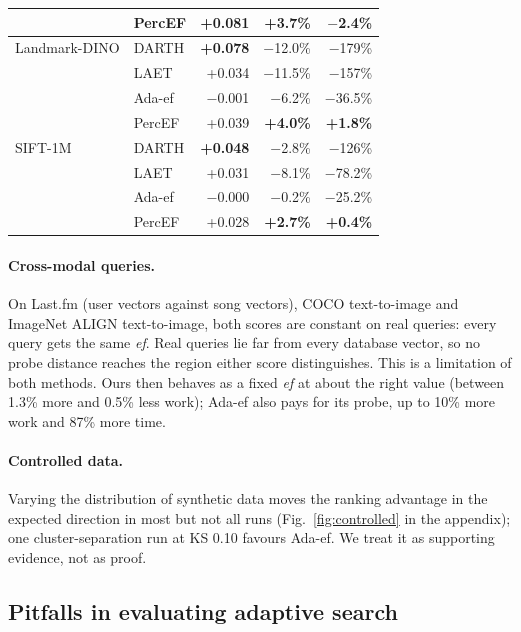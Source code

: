 \documentclass[sigconf,review=false,screen]{acmart}
\newcommand{\ef}{\textit{ef}}
\begin{document}
\begin{table}[t]
\begin{tabular}{llrrr}
                  & PercEF & +0.081 & \textbf{+3.7\%} & \textbf{$-$2.4\%} \\
    \midrule
    Landmark-DINO & DARTH  & \textbf{+0.078} & $-$12.0\% & $-$179\% \\
                  & LAET   & +0.034 & $-$11.5\% & $-$157\% \\
                  & Ada-ef & $-$0.001 & $-$6.2\% & $-$36.5\% \\
                  & PercEF & +0.039 & \textbf{+4.0\%} & \textbf{+1.8\%} \\
    \midrule
    SIFT-1M       & DARTH  & \textbf{+0.048} & $-$2.8\% & $-$126\% \\
                  & LAET   & +0.031 & $-$8.1\% & $-$78.2\% \\
                  & Ada-ef & $-$0.000 & $-$0.2\% & $-$25.2\% \\
                  & PercEF & +0.028 & \textbf{+2.7\%} & \textbf{+0.4\%} \\
    \bottomrule
  \end{tabular}
\end{table}

\paragraph{Cross-modal queries.}
On Last.fm (user vectors against song vectors), COCO text-to-image and ImageNet ALIGN text-to-image,
both scores are constant on real queries: every query gets the same \ef{}. Real queries lie far
from every database vector, so no probe distance reaches the region either score distinguishes.
This is a limitation of both methods. Ours then behaves as a fixed \ef{} at about the right value
(between 1.3\% more and 0.5\% less work); Ada-ef also pays for its probe, up to 10\% more work and
87\% more time.

\paragraph{Controlled data.}
Varying the distribution of synthetic data moves the ranking advantage in the expected direction
in most but not all runs (Fig.~\ref{fig:controlled} in the appendix); one cluster-separation run at
KS 0.10 favours Ada-ef. We treat it as supporting evidence, not as proof.

\subsection{Pitfalls in evaluating adaptive search}\label{sec:pitfalls}
\end{document}
